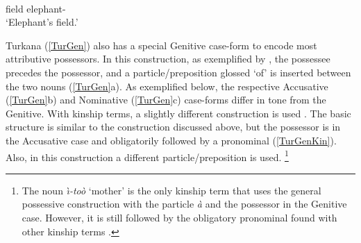 \begin{exe}
\ex\label{TenGen}
\gll{}   \\
field \am{} elephant-\gen{}\\
\glt `Elephant's field.'  
\end{exe}

Turkana (\ref{TurGen}) also has a special Genitive case-form to encode most attributive possessors.
In this construction, as exemplified by \citet[266--268]{Dimmendaal:1982}, the possessee precedes the possessor, and a particle/preposition glossed `of' is inserted between the two nouns (\ref{TurGen}a). 
As exemplified below, the respective Accusative (\ref{TurGen}b) and Nominative (\ref{TurGen}c) case-forms differ in tone from the Genitive.
With kinship terms, a slightly different construction is used \citep[340]{Dimmendaal:1982}. 
The basic structure is similar to the construction discussed above, but the possessor is in the Accusative case and obligatorily followed by a pronominal (\ref{TurGenKin}). 
Also, in this construction a different particle/preposition is used.
\footnote{The noun \emph{\`\i-to\`o} `mother' is the only kinship term that uses the general possessive construction with the particle \emph{\`a} and the possessor in the Genitive case. However, it is still followed by the obligatory pronominal found with other kinship terms \citep[240]{Dimmendaal:1982}.} 

\pagebreak

\begin{exe}\ex\label{TurGen}
\end{exe}

